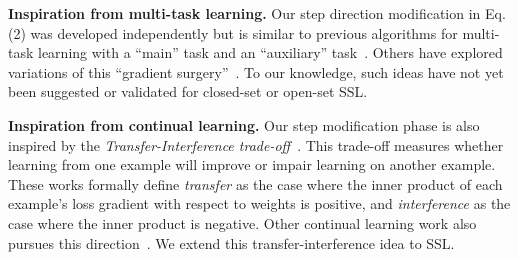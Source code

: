 \textbf{Inspiration from multi-task learning.}
Our step direction modification in Eq. (2) was developed independently but is similar to previous algorithms for multi-task learning with a ``main'' task and an ``auxiliary'' task~\citep{duAdaptingAuxiliaryLosses2020}.
Others have explored variations of this ``gradient surgery''~\citep{yuGradientSurgeryMultiTask2020}.
To our knowledge, such ideas have not yet been suggested or validated for closed-set or open-set SSL.

\textbf{Inspiration from continual learning.}
Our step modification phase is also inspired by the \textit{Transfer-Interference trade-off}~\citep{riemer2018learning, lopez-pazGradientEpisodicMemory2017}.
This trade-off measures whether learning from one example will improve or impair learning on another example.
These works formally define
\emph{transfer} as the case where the inner product of each example's loss gradient with respect to weights is positive, and
\emph{interference} as the case where the inner product is negative.
Other continual learning work also pursues this direction~\citep{chaudhry2018efficient, he2018overcoming, zeng2019continual, farajtabar2020orthogonal}.
We extend this transfer-interference idea to SSL.





